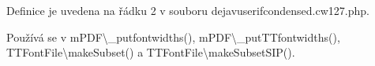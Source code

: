 Definice je uvedena na řádku 2 v souboru dejavuserifcondensed.\-cw127.\-php.



Používá se v m\-P\-D\-F\textbackslash{}\-\_\-putfontwidths(), m\-P\-D\-F\textbackslash{}\-\_\-put\-T\-Tfontwidths(), T\-T\-Font\-File\textbackslash{}make\-Subset() a T\-T\-Font\-File\textbackslash{}make\-Subset\-S\-I\-P().

